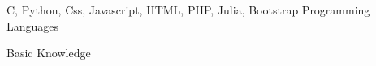 

\begin{cventries}

  \cventry
    {C, Python, Css, Javascript, HTML, PHP, Julia, Bootstrap} %
    {Programming Languages} %
    {} %
    {} %
    {
      \begin{cvitems} %
        \item {Basic Knowledge}
      \end{cvitems}
    }


\end{cventries}
